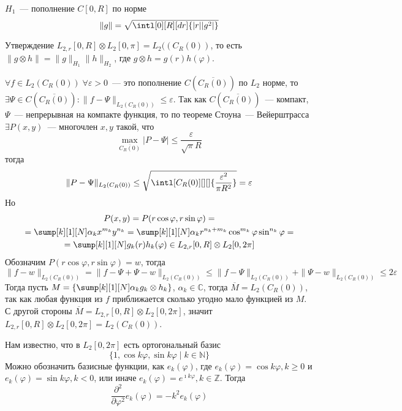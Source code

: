 \documentclass[14pt]{extarticle}
\begin{document}
$H_1$~--- пополнение $C[0, R]$ по норме
$$
\|g\| = \sqrt{\intl[0][R][dr]{|r||g^2|}}
$$
\begin{MathCl}{Утверждение}
    $L_{2,r}[0,R] \otimes L_2[0,\pi] = L_2((C_R(0))$, то есть $\|g \otimes h\| = \|g\|_{H_1}
    \|h\|_{H_2}$, где $g \otimes h = g(r)h(\varphi)$.
\end{MathCl}
\begin{Proof}
    $\forall f \in L_2(C_R(0))\;\forall \varepsilon > 0$~--- это пополнение $C(\overline{C_R(0)})$
    по $L_2$ норме, то $\exists \Psi \in C(\overline{C_R(0)}) \colon \|f - \Psi\|_{L_2(C_R(0))} \le 
    \varepsilon$.
    Так как $C(\overline{C_R(0)})$~--- компакт, $\Psi$~--- непрерывная на компакте функция, то
    по теореме Стоуна~--- Вейерштрасса $\exists P(x, y)$~--- многочлен $x, y$ такой, что
    $$
    \max \limits_{\overline{C_R(0)}} |P - \Psi| \le \dfrac{\varepsilon}{\sqrt{\pi}R}
    $$
    тогда
    $$
    \|P - \Psi\|_{L_2(C_R(0))} \le \sqrt{\intl[C_R(0)][][]{\dfrac{\varepsilon^2}{\pi R^2}}} = \varepsilon
    $$
    Но 
    \begin{multline*}
        P(x, y) = P(r \cos{\varphi}, r \sin{\varphi}) =\\=
        \sump[k][1][N]\alpha_k x^{m_k} y^{n_k} =
        \sump[k][1][N] \alpha_k r^{n_k + m_k} \cos^{m_k}{\varphi} \sin^{n_k}{\varphi}  =\\=
        \sump[k][1][N] g_k(r) h_k(\varphi) \in L_{2,r}[0,R] \otimes L_2[0, 2\pi]
    \end{multline*}
    Обозначим $P(r \cos{\varphi}, r \sin{\varphi}) = w$, тогда
    $$
    \|f - w\|_{L_2(C_R(0))} = \|f - \Psi + \Psi - w\|_{L_2(C_R(0))} \le \|f - \Psi\|_{L_2(C_R(0))} + 
    \|\Psi - w\|_{L_2(C_R(0))} \le 2 \varepsilon
    $$
    Тогда пусть $M = \{\sump[k][1][N] \alpha_k g_k \otimes h_k\}$, $\alpha_k \in \mathbb C$,
    тогда $\overline{M} = L_2(C_R(0))$, так как любая функция из $f$ приближается сколько
    угодно мало функцией из $M$.
    С другой стороны $\overline{M} = L_{2, r}[0,R] \otimes L_2[0, 2\pi]$,
    значит $L_{2, r}[0,R] \otimes L_2[0, 2\pi] = L_2(C_R(0))$.
\end{Proof}

Нам известно, что в $L_2[0, 2\pi]$ есть ортогональный базис
$$
\{1, \cos{k \varphi}, \sin{k \varphi} \mid k \in \mathbb N\}
$$
Можно обозначить базисные функции, как $e_k(\varphi)$, где
$e_k(\varphi) = \cos{k \varphi}, k \ge 0$ и $e_k(\varphi) = \sin{k \varphi}, k < 0$, или иначе
$e_k(\varphi) = e^{\imath k \varphi}, k \in \mathbb Z$.
Тогда
$$
\dfrac{\partial^2}{\partial \varphi^2} e_k(\varphi) = -k^2 e_k(\varphi)
$$
\end{document}
